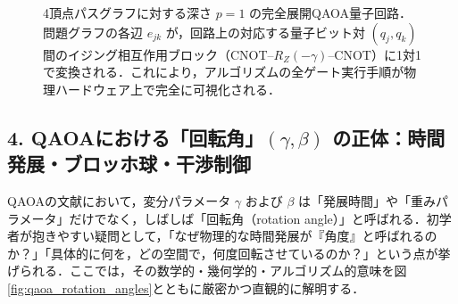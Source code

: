 \documentclass[11pt,a4paper,oneside,openany]{ltjsbook}
\theoremstyle{definition}
\theoremstyle{plain}
\theoremstyle{remark}
\begin{document}
\begin{figure}[htbp]
\caption{4頂点パスグラフに対する深さ $p=1$ の完全展開QAOA量子回路．問題グラフの各辺 $e_{jk}$ が，回路上の対応する量子ビット対 $(q_j, q_k)$ 間のイジング相互作用ブロック（CNOT--$R_Z(-\gamma)$--CNOT）に1対1で変換される．これにより，アルゴリズムの全ゲート実行手順が物理ハードウェア上で完全に可視化される．}
\label{fig:qaoa_maxcut4_circuit}
\end{figure}

\subsection{4. QAOAにおける「回転角」$(\gamma, \beta)$ の正体：時間発展・ブロッホ球・干渉制御}
QAOAの文献において，変分パラメータ $\gamma$ および $\beta$ は「発展時間」や「重みパラメータ」だけでなく，しばしば「回転角（rotation angle）」と呼ばれる．初学者が抱きやすい疑問として，「なぜ物理的な時間発展が『角度』と呼ばれるのか？」「具体的に何を，どの空間で，何度回転させているのか？」という点が挙げられる．ここでは，その数学的・幾何学的・アルゴリズム的意味を図\ref{fig:qaoa_rotation_angles}とともに厳密かつ直観的に解明する．
\end{document}

